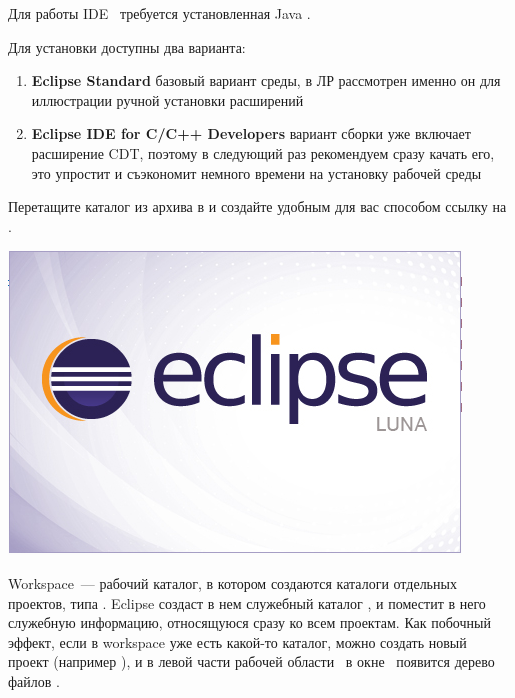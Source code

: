 \label{eclipseinstall}

\bigskip
Для работы IDE \eclipse\ требуется установленная Java .

\bigskip
Для установки доступны два варианта:
\begin{enumerate}
\item \textbf{Eclipse Standard} базовый вариант среды, в ЛР рассмотрен именно он для иллюстрации 
ручной установки расширений
\item \textbf{Eclipse IDE for C/C++ Developers} вариант сборки 
уже включает расширение CDT, поэтому в следующий раз рекомендуем сразу качать его,
это упростит и съэкономит немного времени на установку рабочей среды
\end{enumerate}

\bigskip{}

\bigskip{}

\bigskip Перетащите каталог  из архива в  и
создайте удобным для вас способом ссылку на .

\bigskip\includegraphics[height=0.3\textheight]{eclipse/EclipseSplash.png}

\bigskip Workspace\ --- рабочий каталог, в котором создаются каталоги отдельных
проектов, типа . Eclipse создаст в нем служебный каталог
, и поместит в него служебную информацию, относящуюся сразу ко
всем проектам. Как побочный эффект, если в workspace уже есть какой-то каталог,
можно создать новый проект (например ), и в левой части рабочей
области \eclipse\ в окне \ появится дерево файлов
.

